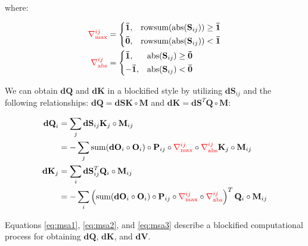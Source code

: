 where:

\begin{align*}
    \textcolor{red}{\nabla_{\max}^{ij}} &= \left\{
        \begin{aligned}
        &\mathbf{\bar{1}}, &\text{rowsum}(\text{abs}(\mathbf{S}_{ij})) \ge \mathbf{\bar{1}}\\
        &\mathbf{\bar{0}}, &\text{rowsum}(\text{abs}(\mathbf{S}_{ij})) < \mathbf{\bar{1}}\\
        \end{aligned}
    \right. \\
    \textcolor{red}{\nabla_{\text{abs}}^{ij}} &= \left\{
        \begin{aligned}
        &\mathbf{\bar{1}}, &\text{abs}(\mathbf{S}_{ij}) \ge \mathbf{\bar{0}}\\
        &\mathbf{-\bar{1}}, &\text{abs}(\mathbf{S}_{ij}) < \mathbf{\bar{0}}\\
        \end{aligned}
    \right.
\end{align*}

We can obtain $\mathbf{dQ}$ and $\mathbf{dK}$ in a blockified style by utilizing $\mathbf{dS}_{ij}$ and the following relationships: $\mathbf{dQ}=\mathbf{dS}\mathbf{K}\circ \mathbf{M}$ and $\mathbf{dK}=\mathbf{dS}^T\mathbf{Q}\circ \mathbf{M}$:

\begin{align}
\mathbf{dQ}_i &= \sum_j \mathbf{dS}_{ij}\mathbf{K}_j\circ \mathbf{M}_{ij} \notag\\
&= -\sum_{j}\text{sum}(\mathbf{dO}_i\circ\mathbf{O}_i)\circ{\mathbf{P}_{ij}} \circ \textcolor{red}{\nabla_{\max}^{ij}} \circ \textcolor{red}{\nabla_{\text{abs}}^{ij}}\mathbf{K}_j\circ \mathbf{M}_{ij}  \label{eq:msa2}\\
\mathbf{dK}_j &= \sum_i\mathbf{dS}_{ij}^T\mathbf{Q}_i\circ \mathbf{M}_{ij} \notag\\
&=-\sum_i\left(
    \text{sum}(\mathbf{dO}_i\circ\mathbf{O}_i)\circ{\mathbf{P}_{ij}} \circ \textcolor{red}{\nabla_{\max}^{ij}} \circ \textcolor{red}{\nabla_{\text{abs}}^{ij}}
    \right)^T \mathbf{Q}_i \circ \mathbf{M}_{ij} \label{eq:msa3}
\end{align}

Equations \eqref{eq:msa1}, \eqref{eq:msa2}, and \eqref{eq:msa3} describe a blockified computational process for obtaining $\mathbf{dQ}$, $\mathbf{dK}$, and $\mathbf{dV}$.





